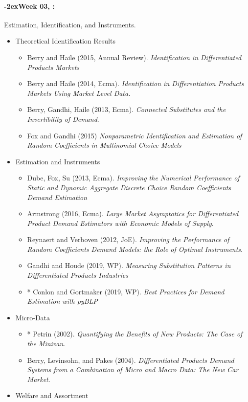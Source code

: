 \documentclass[11pt]{article}
\newcommand{\week}[1]{%
  \paragraph*{\kern-2ex\quad #1, \syldate{\today}:}%
  \ifdim\wd1=\wd\THURSDAY
    \AdvanceDate[7]
  \else
    \AdvanceDate[7]
  \fi%
}
\begin{document}
\week{Week 03} Estimation, Identification, and Instruments.
\begin{itemize}
\item Theoretical Identification Results
\begin{itemize}
\item Berry and Haile (2015, Annual Review). \textit{Identification in Differentiated Products Markets}
\item Berry and Haile (2014, Ecma). \textit{Identification in Differentiation Products Markets Using Market Level Data.}
\item Berry, Gandhi, Haile (2013, Ecma). \textit{Connected Substitutes and the Invertibility of Demand}.
\item Fox and Gandhi (2015) \textit{Nonparametric Identification and Estimation of Random Coefficients in Multinomial Choice Models}
\end{itemize}
\item Estimation and Instruments
\begin{itemize}
\item Dube, Fox, Su (2013, Ecma). \textit{Improving the Numerical Performance of Static and Dynamic Aggregate Discrete Choice Random Coefficients Demand Estimation}
\item Armstrong (2016, Ecma). \textit{Large Market Asymptotics for Differentiated Product Demand Estimators with Economic Models of Supply}.
\item Reynaert and Verboven (2012, JoE). \textit{Improving the Performance of Random Coefficients Demand Models: the Role of Optimal Instruments}.
\item Gandhi and Houde (2019, WP). \textit{Measuring Substitution Patterns in Differentiated Products Industries}
\item * Conlon and Gortmaker (2019, WP). \textit{Best Practices for Demand Estimation with pyBLP}
\end{itemize}
\item Micro-Data
\begin{itemize}
\item * Petrin (2002). \textit{Quantifying the Benefits of New Products: The Case of the Minivan}.
\item Berry, Levinsohn, and Pakes (2004). \textit{Differentiated Products Demand Systems from a Combination of Micro and Macro Data: The New Car Market}.
\end{itemize}
\item Welfare and Assortment
\begin{itemize}

\end{itemize}
\end{itemize}
\end{document}
